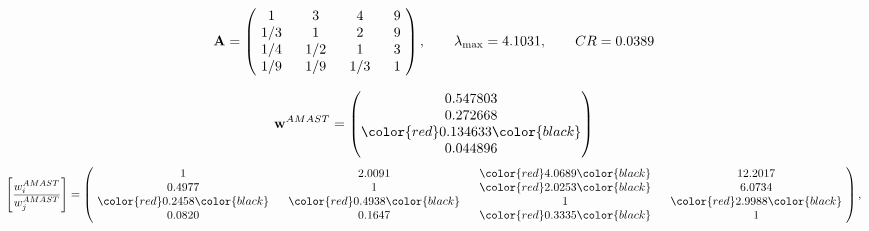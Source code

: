 \begin{example}
\begin{equation*}
\mathbf{A} =
\begin{pmatrix}
$\,\,$ 1 $\,\,$ & $\,\,$3$\,\,$ & $\,\,$4$\,\,$ & $\,\,$9 $\,\,$ \\
$\,\,$ 1/3$\,\,$ & $\,\,$ 1 $\,\,$ & $\,\,$2$\,\,$ & $\,\,$9 $\,\,$ \\
$\,\,$ 1/4$\,\,$ & $\,\,$ 1/2$\,\,$ & $\,\,$ 1 $\,\,$ & $\,\,$3 $\,\,$ \\
$\,\,$ 1/9$\,\,$ & $\,\,$ 1/9$\,\,$ & $\,\,$ 1/3$\,\,$ & $\,\,$ 1  $\,\,$ \\
\end{pmatrix},
\qquad
\lambda_{\max} =
4.1031,
\qquad
CR = 0.0389
\end{equation*}

\begin{equation*}
\mathbf{w}^{AMAST} =
\begin{pmatrix}
0.547803\\
0.272668\\
\color{red} 0.134633\color{black} \\
0.044896
\end{pmatrix}\end{equation*}
\begin{equation*}
\left[ \frac{{w}^{AMAST}_i}{{w}^{AMAST}_j} \right] =
\begin{pmatrix}
$\,\,$ 1 $\,\,$ & $\,\,$2.0091$\,\,$ & $\,\,$\color{red} 4.0689\color{black} $\,\,$ & $\,\,$12.2017$\,\,$ \\
$\,\,$0.4977$\,\,$ & $\,\,$ 1 $\,\,$ & $\,\,$\color{red} 2.0253\color{black} $\,\,$ & $\,\,$6.0734  $\,\,$ \\
$\,\,$\color{red} 0.2458\color{black} $\,\,$ & $\,\,$\color{red} 0.4938\color{black} $\,\,$ & $\,\,$ 1 $\,\,$ & $\,\,$\color{red} 2.9988\color{black}  $\,\,$ \\
$\,\,$0.0820$\,\,$ & $\,\,$0.1647$\,\,$ & $\,\,$\color{red} 0.3335\color{black} $\,\,$ & $\,\,$ 1  $\,\,$ \\
\end{pmatrix},
\end{equation*}


\end{example}
